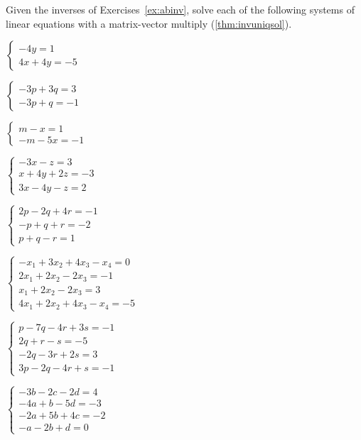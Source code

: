 \begin{exercise} \label{ex:} 
Given the inverses of Exercises~\ref{ex:abinv}, solve each of the following systems of linear equations with a matrix-vector multiply (\autoref{thm:invuniqsol}).
\begin{parts}
\item \(\begin{cases} -4y=1\\4x+4y=-5 \end{cases}\)

\item \(\begin{cases} -3p+3q=3\\-3p+q=-1 \end{cases}\)

\item \(\begin{cases} m-x=1\\-m-5x=-1 \end{cases}\)

\item \(\begin{cases} -3x-z=3\\ x+4y+2z=-3\\ 3x-4y-z=2 \end{cases}\)

\item \(\begin{cases} 2p-2q+4r=-1\\ -p+q+r=-2\\ p+q-r=1 \end{cases}\)

\item \(\begin{cases} -x_1+3x_2+4x_3-x_4=0
\\2x_1+2x_2-2x_3=-1
\\x_1+2x_2-2x_3=3
\\4x_1+2x_2+4x_3-x_4=-5 \end{cases}\)

\item \(\begin{cases} p-7q-4r+3s=-1
\\2q+r-s=-5
\\-2q-3r+2s=3
\\3p-2q-4r+s=-1 \end{cases}\)

\item \(\begin{cases}-3b-2c-2d=4
\\-4a+b-5d=-3
\\-2a+5b+4c=-2
\\-a-2b+d=0 \end{cases}\)

\end{parts}
\end{exercise}




